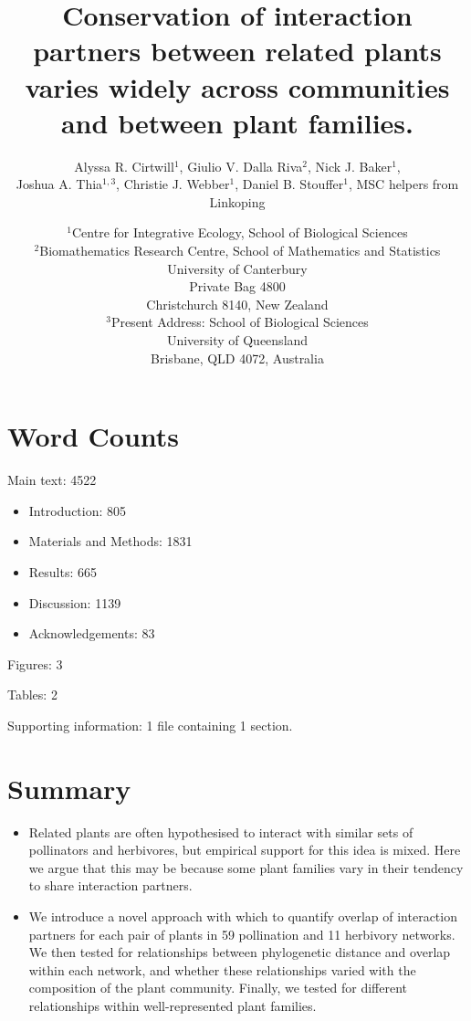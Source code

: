 \documentclass[12pt]{article}
\title{Conservation of interaction partners between related plants varies widely across communities and between plant families.}
\author{Alyssa R. Cirtwill$^{1}$, Giulio V. Dalla Riva$^{2}$, Nick J. Baker$^{1}$,\\
 Joshua A. Thia$^{1,3}$, Christie J. Webber$^{1}$, Daniel B. Stouffer$^{1}$, MSC helpers from Linkoping}
\date{\small$^1$Centre for Integrative Ecology, School of Biological Sciences\\
    \medskip$^2$Biomathematics Research Centre, School of Mathematics and Statistics\\
            University of Canterbury\\Private Bag 4800\\
Christchurch 8140, New Zealand\\
\medskip$^3$Present Address: School of Biological Sciences\\
University of Queensland\\Brisbane, QLD 4072, Australia }
\begin{document}
\maketitle
\baselineskip=8.5mm
\begin{spacing}{1.0}

\section*{Word Counts}

Main text: 4522

\begin{itemize}
  \item Introduction: 805 
  \item Materials and Methods: 1831 
  \item Results: 665
  \item Discussion: 1139 
  \item Acknowledgements: 83
\end{itemize}



Figures: 3


Tables: 2


Supporting information: 1 file containing 1 section.


\vspace{0.4 in}

\section*{Summary}

  \begin{itemize}
    \item Related plants are often hypothesised to interact with similar sets of 
          pollinators and herbivores, but empirical support for this idea is mixed.
          Here we argue that this may be because some plant families vary in their 
          tendency to share interaction partners.

    \item We introduce a novel approach with which to quantify
          overlap of interaction
          partners for each pair of plants in 59 pollination and 11 herbivory
          networks.  We then tested for relationships between phylogenetic 
          distance and overlap within each network, and whether these 
          relationships varied with the composition of the plant community.
          Finally, we tested for different relationships within well-represented
          plant families.


\end{itemize}
\end{spacing}
\end{document}
